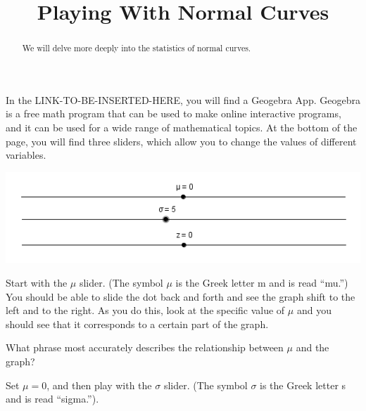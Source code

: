 \documentclass{ximera}
\title{Playing With Normal Curves}
\begin{document}
\begin{abstract}
We will delve more deeply into the statistics of normal curves.
\end{abstract}
\maketitle

In the LINK-TO-BE-INSERTED-HERE, you will find a Geogebra App. Geogebra is a free math program that can be used to make online interactive programs, and it can be used for a wide range of mathematical topics. At the bottom of the page, you will find three sliders, which allow you to change the values of different variables.

\begin{center}
\includegraphics[scale=0.75]{Sliders.png}
\end{center}

Start with the $\mu$ slider. (The symbol $\mu$ is the Greek letter m and is read ``mu.'') You should be able to slide the dot back and forth and see the graph shift to the left and to the right. As you do this, look at the specific value of $\mu$ and you should see that it corresponds to a certain part of the graph.

\begin{question}
What phrase most accurately describes the relationship between $\mu$ and the graph?
  \begin{solution}
    \begin{multiple-choice}
    \end{multiple-choice}
  \end{solution}
\end{question}

Set $\mu = 0$, and then play with the $\sigma$ slider. (The symbol $\sigma$ is the Greek letter s and is read ``sigma.''). 
\end{document}
